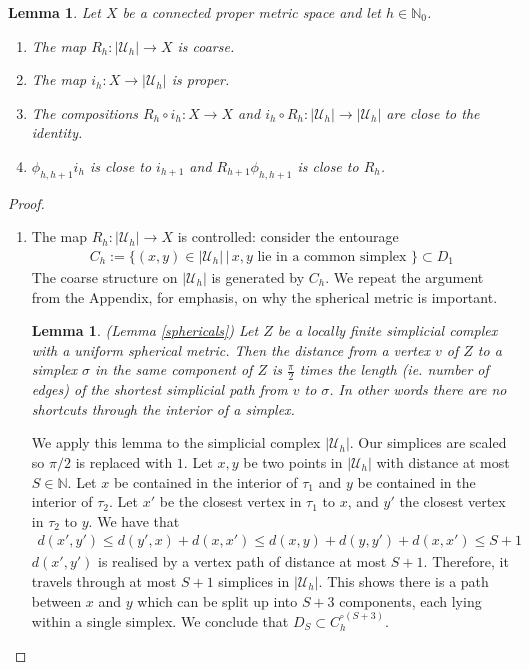 \documentclass[a4paper,11pt]{article}
\theoremstyle{definition}
\theoremstyle{plain}
\newtheorem{lemma}[definition]{Lemma}
\newtheorem*{lemma*}{Lemma}
\theoremstyle{remark}
\begin{document}
{\begin{lemma} Let $X$ be a connected proper metric space and let $h\in \mathbb{N}_{0}$. \begin{enumerate}
\item The map $R_{h}: |\mathcal{U}_{h}| \rightarrow X$ is coarse. 
\item The map $i_{h}: X \rightarrow |\mathcal{U}_{h}|$ is proper. 
\item The compositions $R_{h}\circ i_{h}: X\rightarrow X$ and $i_{h}\circ R_{h}: |\mathcal{U}_{h}|\rightarrow |\mathcal{U}_{h}|$ are close to the identity. 
\item $\phi_{h,h+1} i_{h}$ is close to $i_{h+1}$ and $R_{h+1}\phi_{h,h+1}$ is close to $R_{h}$.
\end{enumerate}
\end{lemma}

\begin{proof} 
\begin{enumerate}
\item The map $R_{h}: |\mathcal{U}_{h}| \rightarrow X$ is controlled: consider the entourage
\begin{align*}
C_{h}:=\{(x,y)\in |\mathcal{U}_{h}| \,|\, x,y \text{ lie in a common simplex }\} \subset D_{1}
\end{align*}
The coarse structure on $|\mathcal{U}_{h}|$ is generated by $C_{h}$. We repeat the argument from the Appendix, for emphasis, on why the spherical metric is important. 

\begin{lemma*} (Lemma \ref{sphericals}) Let $Z$ be a locally finite simplicial complex with a uniform spherical metric. Then the distance from a vertex $v$ of $Z$ to a simplex $\sigma$ in the same component of $Z$ is $\frac{\pi}{2}$ times the length (ie. number of edges) of the shortest simplicial path from $v$ to $\sigma$. In other words there are no shortcuts through the interior of a simplex.
\end{lemma*}

We apply this lemma to the simplicial complex $|\mathcal{U}_{h}|$. Our simplices are scaled so $\pi/2$ is replaced with $1$. Let $x,y$ be two points in $|\mathcal{U}_{h}|$ with distance at most $S\in \mathbb{N}$. Let $x$ be contained in the interior of $\tau_{1}$ and $y$ be contained in the interior of $\tau_2$. Let $x'$ be the closest vertex in $\tau_{1}$ to $x$, and $y'$ the closest vertex in $\tau_2$ to $y$.  We have that 
\begin{align*}
d(x',y')\leq d(y',x) + d(x,x') \leq d(x,y) + d(y,y') + d(x,x') \leq S+1
\end{align*}
$d(x',y')$ is realised by a vertex path of distance at most  $S+1$. Therefore, it travels through at most $S+1$ simplices in $|\mathcal{U}_{h}|$. This shows there is a path between $x$ and $y$ which can be split up into $S+3$ components, each lying within a single simplex. We conclude that $D_{S} \subset C^{\circ (S+3)}_h$. \\


\end{enumerate}
\end{proof}}
\end{document}
